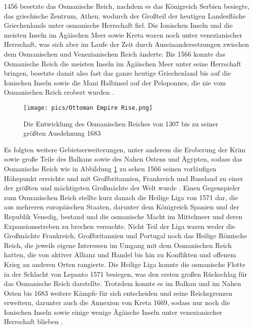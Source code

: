 \documentclass[preprint]{geomorphica} %
\begin{document}
1456 besetzte das Osmanische Reich, nachdem es das Königreich Serbien besiegte, das griechische Zentrum, Athen, wodurch der Großteil der heutigen Landesfläche Griechenlands unter osmanische Herrschaft fiel.
Die Ionischen Inseln und die meisten Inseln im Ägäischen Meer sowie Kreta waren noch unter venezianischer Herrschaft, was sich aber im Laufe der Zeit durch Auseinandersetzungen zwischen dem Osmanischen und Venezianischen Reich änderte.
Bis 1566 konnte das Osmanische Reich die meisten Inseln im Ägäischen Meer unter seine Herrschaft bringen, besetzte damit also fast das ganze heutige Griechenland bis auf die Ionischen Inseln sowie die Mani Halbinsel auf der Peloponnes, die nie vom Osmanischen Reich erobert wurden \cite{Finkel2007, Kinross1979}.

\begin{figure}[h]
    \centering
    \texttt{[image: pics/Ottoman Empire Rise.png]}
    \caption{Die Entwicklung des Osmanischen Reiches von 1307 bis zu seiner größten Ausdehnung 1683 \cite{Eynaud2014}}
    \label{pic:ottomanrise}
\end{figure}

Es folgten weitere Gebietserweiterungen, unter anderem die Eroberung der Krim sowie große Teile des Balkans sowie des Nahen Ostens und Ägypten, sodass das Osmanische Reich wie in Abbildung \ref{pic:ottomanrise} zu sehen 1566 seinen vorläufigen Höhepunkt erreichte und mit Großbritannien, Frankreich und Russland zu einer der größten und mächtigsten Großmächte der Welt wurde \cite{Imber2002}.
Einen Gegenspieler zum Osmanischen Reich stellte kurz danach die Heilige Liga von 1571 dar, die aus mehreren europäischen Staaten, darunter dem Königreich Spanien und der Republik Venedig, bestand und die osmanische Macht im Mittelmeer und deren Expansionsstreben zu brechen versuchte.
Nicht Teil der Liga waren weder die Großmächte Frankreich, Großbritannien und Portugal noch das Heilige Römische Reich, die jeweils eigene Interessen im Umgang mit dem Osmanischen Reich hatten, die von aktiver Allianz und Handel bis hin zu Konflikten und offenem Krieg an anderen Orten rangierte.
Die Heilige Liga konnte die osmanische Flotte in der Schlacht von Lepanto 1571 besiegen, was den ersten großen Rückschlag für das Osmanische Reich darstellte.
Trotzdem konnte es im Balkan und im Nahen Osten bis 1683 weitere Kämpfe für sich entscheiden und seine Reichsgrenzen erweitern, darunter auch die Annexion von Kreta 1669, sodass nur noch die Ionischen Inseln sowie einige wenige Ägäische Inseln unter venezianischer Herrschaft blieben \cite{Kinross1979, Kafadar1995, Woodhouse1998}.
\end{document}
